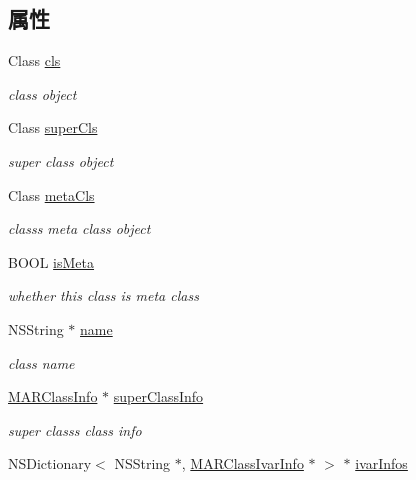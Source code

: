 \subsection*{属性}
\begin{DoxyCompactItemize}
\item 
Class \hyperlink{interface_m_a_r_class_info_ad48c6e19f8afea0a248f8709e7d0741d}{cls}
\begin{DoxyCompactList}\small\item\em class object \end{DoxyCompactList}\item 
Class \hyperlink{interface_m_a_r_class_info_aae66c24be2e8646387d12d4960f67a4e}{super\+Cls}
\begin{DoxyCompactList}\small\item\em super class object \end{DoxyCompactList}\item 
Class \hyperlink{interface_m_a_r_class_info_a91f15de18f9ac993bb4585289597b1c4}{meta\+Cls}
\begin{DoxyCompactList}\small\item\em class\textquotesingle{}s meta class object \end{DoxyCompactList}\item 
B\+O\+OL \hyperlink{interface_m_a_r_class_info_a8f1efa03db2d9d4b4a318b138a64d7b0}{is\+Meta}
\begin{DoxyCompactList}\small\item\em whether this class is meta class \end{DoxyCompactList}\item 
N\+S\+String $\ast$ \hyperlink{interface_m_a_r_class_info_a2ae67ed3956a094512e62f7bd8fd8b77}{name}
\begin{DoxyCompactList}\small\item\em class name \end{DoxyCompactList}\item 
\hyperlink{interface_m_a_r_class_info}{M\+A\+R\+Class\+Info} $\ast$ \hyperlink{interface_m_a_r_class_info_a3066f3eb80f0c9157f4b9795ddfad63d}{super\+Class\+Info}
\begin{DoxyCompactList}\small\item\em super class\textquotesingle{}s class info \end{DoxyCompactList}\item 
N\+S\+Dictionary$<$ N\+S\+String $\ast$, \hyperlink{interface_m_a_r_class_ivar_info}{M\+A\+R\+Class\+Ivar\+Info} $\ast$ $>$ $\ast$ \hyperlink{interface_m_a_r_class_info_a47adfee114271f55a233f4240c499f98}{ivar\+Infos}

\end{DoxyCompactItemize}
